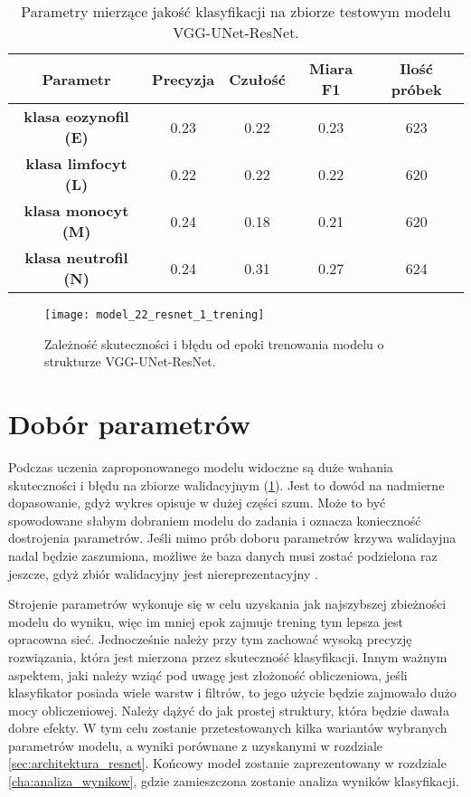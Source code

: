 {\begin{table}[h!]
\centering
\caption[Short Heading]{Parametry mierzące jakość klasyfikacji na zbiorze testowym modelu VGG-UNet-ResNet.}
\label{tab:ResNet_1_params_val}
\begin{tabular}{|c|c|c|c|c|}
\hline
\textbf{Parametr}                               & \textbf{Precyzja} & \textbf{Czułość} & \textbf{Miara F1} & \textbf{Ilość próbek} \\ \hline
\textbf{klasa eozynofil (E)} & 0.23   & 0.22   & 0.23 & 623  \\ \hline
\textbf{klasa limfocyt (L)} & 0.22  & 0.22 & 0.22 & 620  \\ \hline
\textbf{klasa monocyt (M)} & 0.24   & 0.18    & 0.21  & 620  \\ \hline
\textbf{klasa neutrofil (N)} & 0.24   & 0.31    & 0.27  & 624  \\ \hline
\end{tabular}
\end{table}

\begin{figure}[h!]
	\centering
	\centering
		\texttt{[image: model\_22\_resnet\_1\_trening]}	
	\caption{Zależność skuteczności i błędu od epoki trenowania modelu o strukturze VGG-UNet-ResNet.}	\label{fig:model_22_resnet_1_trening}
\end{figure}

}
\section{Dobór parametrów}
\label{dobor_parametrow}

Podczas uczenia zaproponowanego modelu widoczne są duże wahania skuteczności i błędu na zbiorze walidacyjnym (\ref{fig:model_22_resnet_1_trening}). Jest to dowód na nadmierne dopasowanie, gdyż wykres opisuje w dużej części szum. Może to być spowodowane słabym dobraniem modelu do zadania i oznacza konieczność dostrojenia parametrów. Jeśli mimo prób doboru parametrów krzywa walidayjna nadal będzie zaszumiona, możliwe że baza danych musi zostać podzielona raz jeszcze, gdyż zbiór walidacyjny jest niereprezentacyjny \cite{learning_curve_diagnostics}.

{\parindent0pt
Strojenie parametrów wykonuje się w celu uzyskania jak najszybszej zbieżności modelu do wyniku, więc im mniej epok zajmuje trening tym lepsza jest opracowna sieć. Jednocześnie należy przy tym zachować wysoką precyzję rozwiązania, która jest mierzona przez skuteczność klasyfikacji. Innym ważnym aspektem, jaki należy wziąć pod uwagę jest złożoność obliczeniowa, jeśli klasyfikator posiada wiele warstw i filtrów, to jego użycie będzie zajmowało dużo mocy obliczeniowej. Należy dążyć do jak prostej struktury, która będzie dawała dobre efekty. W tym celu zostanie przetestowanych kilka wariantów wybranych parametrów modelu, a wyniki porównane z uzyskanymi w rozdziale \ref{sec:architektura_resnet}. Końcowy model zostanie zaprezentowany w rozdziale \ref{cha:analiza_wynikow}, gdzie zamieszczona zostanie analiza wyników klasyfikacji.
}
